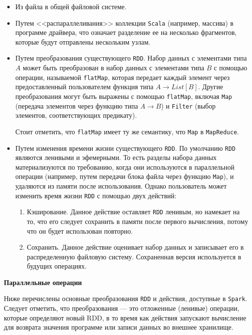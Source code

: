 \begin{itemize}
  \item Из файла в общей файловой системе.
  \item Путем <<распараллеливания>> коллекции \texttt{Scala} (например, массива) в программе драйвера, что означает разделение ее на несколько фрагментов, которые будут отправлены нескольким узлам.
  \item Путем преобразования существующего \texttt{RDD}. 
    Набор данных с элементами типа $A$ может быть преобразован в набор данных с элементами типа $B$ с помощью операции, называемой \texttt{flatMap}, которая передает каждый элемент через предоставленный пользователем функция типа $A \rightarrow List[B]$. 
    Другие преобразования могут быть выражены с помощью \texttt{flatMap}, включая \texttt{Map} (передача элементов через функцию типа $A \rightarrow B$) и \texttt{Filter} (выбор элементов, соответствующих предикату).
    
    Стоит отметить, что \texttt{flatMap} имеет ту же семантику, что \texttt{Map} в \texttt{MapReduce}.
  \item Путем изменения времени жизни существующего \texttt{RDD}.
    По умолчанию \texttt{RDD} являются ленивыми и эфемерными. 
    То есть разделы набора данных материализуются по требованию, когда они используются в параллельной операции (например, путем передачи блока файла через функцию \texttt{Map}), и удаляются из памяти после использования. 
    Однако пользователь может изменить время жизни \texttt{RDD} с помощью двух действий:
    \begin{enumerate}
      \item Кэширование. 
        Данное действие оставляет \texttt{RDD} ленивым, но намекает на то, что его следует сохранить в памяти после первого вычисления, потому что он будет использован повторно.
      \item Сохранить. 
        Данное действие оценивает набор данных и записывает его в распределенную файловую систему. 
        Сохраненная версия используется в будущих операциях.
    \end{enumerate}
\end{itemize}

\textbf{Параллельные операции}

Ниже перечислены основные преобразования \texttt{RDD} и действия, доступные в \texttt{Spark}. 
Следует отметить, что преобразования --- это отложенные (ленивые) операции, которые определяют новый RDD, в то время как действия запускают вычисление для возврата значения программе или записи данных во внешнее хранилище.

